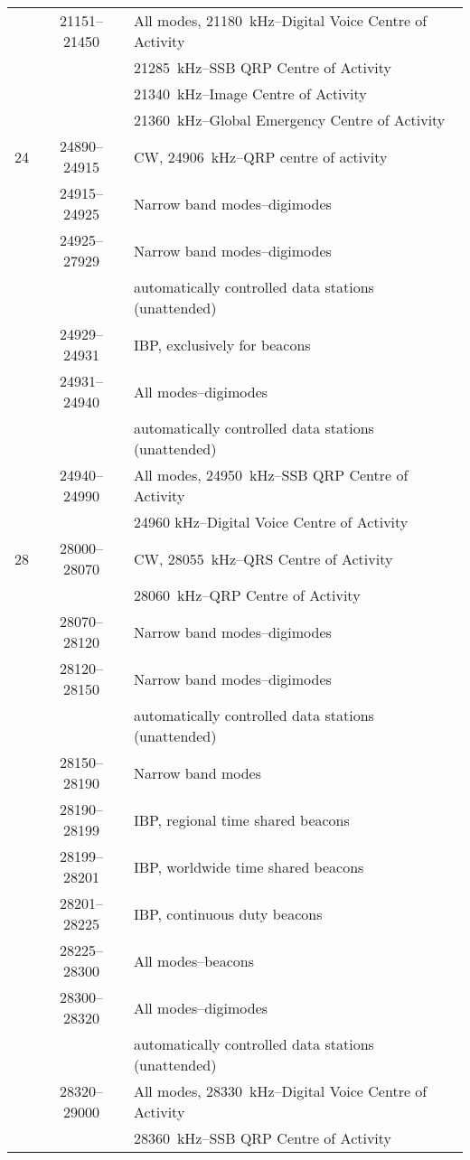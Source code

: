 \begin{xtabular}{lcl}
     & 21151--21450 & All modes, 21180~kHz--Digital Voice Centre of Activity \\
     & & 21285~kHz--SSB QRP Centre of Activity\\
     & & 21340~kHz--Image Centre of Activity\\
     & & 21360~kHz--Global Emergency Centre of Activity\\
%
24   & 24890--24915 & CW, 24906~kHz--QRP centre of activity\\
     & 24915--24925 & Narrow band modes--digimodes\\
     & 24925--27929 & Narrow band modes--digimodes\\
     & & automatically controlled data stations (unattended)\\
     & 24929--24931 & IBP, exclusively for beacons\\
     & 24931--24940 & All modes--digimodes\\
     & & automatically controlled data stations (unattended)\\
     & 24940--24990 & All modes, 24950~kHz--SSB QRP Centre of Activity\\
     & & 24960 kHz--Digital Voice Centre of Activity\\
%
28   & 28000--28070 & CW, 28055~kHz--QRS Centre of Activity\\
 & & 28060~kHz--QRP Centre of Activity\\
     & 28070--28120 & Narrow band modes--digimodes\\
     & 28120--28150 & Narrow band modes--digimodes\\
     & & automatically controlled data stations (unattended)\\
     & 28150--28190 & Narrow band modes\\
     & 28190--28199 & IBP, regional time shared beacons\\
     & 28199--28201 & IBP, worldwide time shared beacons\\
     & 28201--28225 & IBP, continuous duty beacons\\
     & 28225--28300 & All modes--beacons\\
     & 28300--28320 & All modes--digimodes\\
     & & automatically controlled data stations (unattended)\\
     & 28320--29000 & All modes, 28330~kHz--Digital Voice Centre of Activity\\
     & & 28360~kHz--SSB QRP Centre of Activity\\

\end{xtabular}
